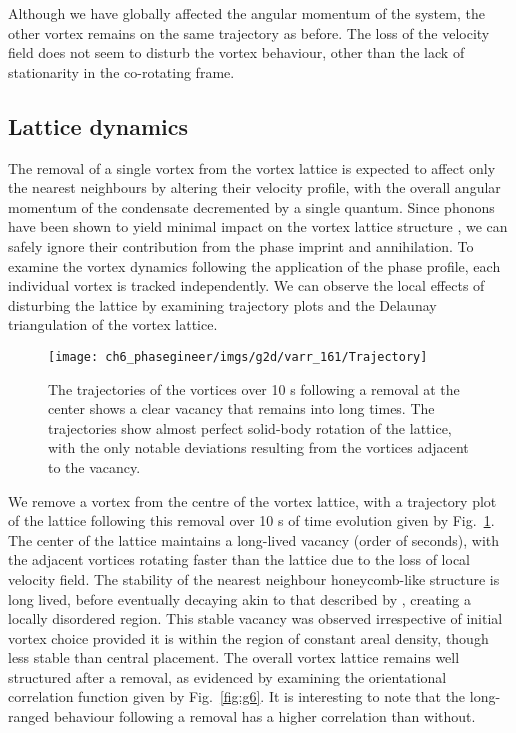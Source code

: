 Although we have globally affected the angular momentum of the system, the other vortex remains on the same trajectory as before. The loss of the velocity field does not seem to disturb the vortex behaviour, other than the lack of stationarity in the co-rotating frame.

\subsection{Lattice dynamics}

The removal of a single vortex from the vortex lattice is expected to affect only the nearest neighbours by altering their velocity profile, with the overall angular momentum of the condensate decremented by a single quantum. Since phonons have been shown to yield minimal impact on the vortex lattice structure \cite{VTX:oriordan_pra_2016}, we can safely ignore their contribution from the phase imprint and annihilation. To examine the vortex dynamics following the application of the phase profile, each individual vortex is tracked independently. We can observe the local effects of disturbing the lattice by examining trajectory plots and the Delaunay triangulation of the vortex lattice.

\begin{figure}
    \texttt{[image: ch6\_phasegineer/imgs/g2d/varr\_161/Trajectory]}
    \caption{The trajectories of the vortices over 10 s following a removal at the center shows a clear vacancy that remains into long times. The trajectories show almost perfect solid-body rotation of the lattice, with the only notable deviations resulting from the vortices adjacent to the vacancy.}
    \label{fig:trajplot}
\end{figure}

We remove a vortex from the centre of the vortex lattice, with a trajectory plot of the lattice following this removal over 10 s of time evolution given by Fig.~\ref{fig:trajplot}. The center of the lattice maintains a long-lived vacancy (order of seconds), with the adjacent vortices rotating faster than the lattice due to the loss of local velocity field. The stability of the nearest neighbour honeycomb-like structure is long lived, before eventually decaying akin to that described by \cite{Vtx:Leipold_jsm_2016}, creating a locally disordered region. This stable vacancy was observed irrespective of initial vortex choice provided it is within the region of constant areal density, though less stable than central placement. The overall vortex lattice remains well structured after a removal, as evidenced by examining the orientational correlation function given by Fig.~\ref{fig:g6}. It is interesting to note that the long-ranged behaviour following a removal has a higher correlation than without.

